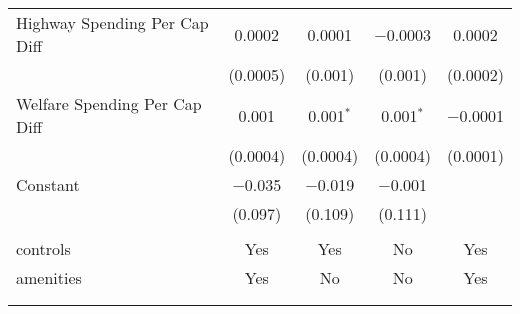 \begin{table}[!htbp]
\begin{tabular}{@{\extracolsep{5pt}}lcccc}
  Highway Spending Per Cap Diff & 0.0002 & 0.0001 & $-$0.0003 & 0.0002 \\ 
  & (0.0005) & (0.001) & (0.001) & (0.0002) \\ 
  Welfare Spending Per Cap Diff & 0.001 & 0.001$^{*}$ & 0.001$^{*}$ & $-$0.0001 \\ 
  & (0.0004) & (0.0004) & (0.0004) & (0.0001) \\ 
  Constant & $-$0.035 & $-$0.019 & $-$0.001 &  \\ 
  & (0.097) & (0.109) & (0.111) &  \\ 
 \hline \\[-1.8ex] 
controls & Yes & Yes & No & Yes \\ 
amenities & Yes & No & No & Yes \\ 
\hline \\[-1.8ex] 
\hline 
\hline \\[-1.8ex] 
\end{tabular} 
\end{table} 

